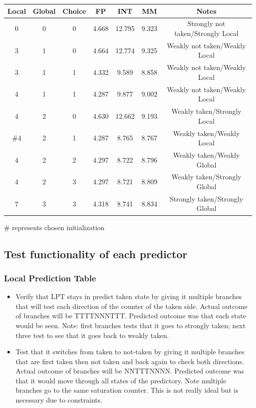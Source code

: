 \documentclass[]{report}   %
\begin{document}
\begin{center}
  \begin{tabular} { c c c | c c c || c }
    Local & Global & Choice & FP & INT & MM & Notes\\
    \hline
    0 & 0 & 0 & 4.668 & 12.795 & 9.323 & Strongly not taken/Strongly Local\\
    3 & 1 & 0 & 4.664 & 12.774 & 9.325 & Weakly not taken/Weakly Local\\
    3 & 1 & 1 & 4.332 & 9.589 & 8.858 & Weakly not taken/Weakly Local\\
    4 & 1 & 1 & 4.287 & 9.877 & 9.002 & Weakly not taken/Weakly Local\\
    4 & 2 & 0 & 4.630 & 12.662 & 9.193 & Weakly taken/Strongly Local\\
    \#4 & 2 & 1 & 4.287 & 8.765 & 8.767 & Weakly taken/Weakly Local\\
    4 & 2 & 2 & 4.297 & 8.722 & 8.796 & Weakly taken/Weakly Global\\
    4 & 2 & 3 & 4.297 & 8.721 & 8.809 & Weakly taken/Strongly Global\\
    7 & 3 & 3 & 4.318 & 8.741 & 8.834 & Strongly taken/Strongly Global\\
  \end{tabular}
\end{center}
\# represents chosen initialization
 
\subsection{Test functionality of each predictor}
\subsubsection{Local Prediction Table}

\begin{itemize}
  \item{Verify that LPT stays in predict taken state by giving it multiple branches that will test each direction of the counter of the taken side. Actual outcome of branches will be TTTTNNNTTT. Predicted outcome was that each state would be seen. Note: first branches tests that it goes to strongly taken; next three test to see that it goes back to weakly taken.}
 
  \item{Test that it switches from taken to not-taken by giving it multiple branches that
     are first taken then not taken and back again to check both directions. Actual outcome of branches will be NNTTTNNNN. Predicted outcome was that it would move through all states of the predictory. Note multiple branches go to the same saturation counter. This is not really ideal but is necessary due to constraints.}
\end{itemize}
 
\end{document}
